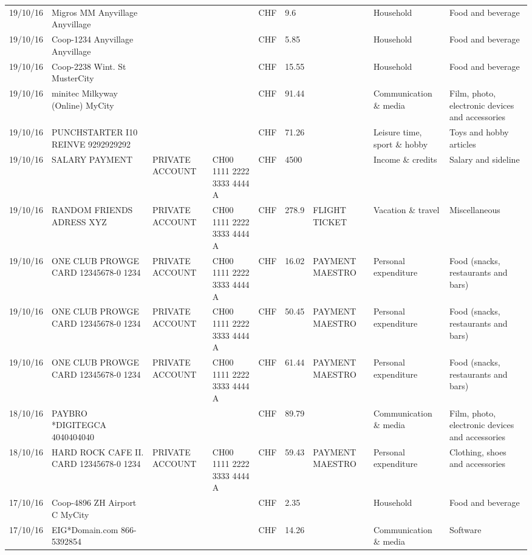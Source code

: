 \begin{landscape}
\begin{table}[t]
\begin{center}
\begin{tabular}{lllllllll}
		19/10/16 & Migros MM Anyvillage    Anyvillage &       &       & CHF   & 9.6   &       & Household & Food and beverage \\
		19/10/16 & Coop-1234 Anyvillage    Anyvillage &       &       & CHF   & 5.85  &       & Household & Food and beverage \\
		19/10/16 & Coop-2238 Wint. St       MusterCity &       &       & CHF   & 15.55 &       & Household & Food and beverage \\
		19/10/16 & minitec Milkyway (Online) MyCity &       &       & CHF   & 91.44 &       & Communication \& media & Film, photo, electronic devices and accessories \\
		19/10/16 & PUNCHSTARTER I10 REINVE   9292929292 &       &       & CHF   & 71.26 &       & Leisure time, sport \& hobby & Toys and hobby articles \\
		19/10/16 & SALARY PAYMENT & PRIVATE ACCOUNT & CH00 1111 2222 3333 4444 A & CHF   & 4500  &       & Income \& credits & Salary and sideline \\
		19/10/16 & RANDOM FRIENDS ADRESS XYZ & PRIVATE ACCOUNT & CH00 1111 2222 3333 4444 A & CHF   & 278.9 & FLIGHT TICKET & Vacation \& travel & Miscellaneous \\
		19/10/16 & ONE CLUB PROWGE CARD 12345678-0 1234 & PRIVATE ACCOUNT & CH00 1111 2222 3333 4444 A & CHF   & 16.02 & PAYMENT MAESTRO & Personal expenditure & Food (snacks, restaurants and bars) \\
		19/10/16 & ONE CLUB PROWGE CARD 12345678-0 1234 & PRIVATE ACCOUNT & CH00 1111 2222 3333 4444 A & CHF   & 50.45 & PAYMENT MAESTRO & Personal expenditure & Food (snacks, restaurants and bars) \\
		19/10/16 & ONE CLUB PROWGE CARD 12345678-0 1234 & PRIVATE ACCOUNT & CH00 1111 2222 3333 4444 A & CHF   & 61.44 & PAYMENT MAESTRO & Personal expenditure & Food (snacks, restaurants and bars) \\
		18/10/16 & PAYBRO *DIGITEGCA      4040404040 &       &       & CHF   & 89.79 &       & Communication \& media & Film, photo, electronic devices and accessories \\
		18/10/16 & HARD ROCK CAFE II. CARD 12345678-0 1234 & PRIVATE ACCOUNT & CH00 1111 2222 3333 4444 A & CHF   & 59.43 & PAYMENT MAESTRO & Personal expenditure & Clothing, shoes and accessories \\
		17/10/16 & Coop-4896 ZH Airport C   MyCity &       &       & CHF   & 2.35  &       & Household & Food and beverage \\
		17/10/16 & EIG*Domain.com           866-5392854 &       &       & CHF   & 14.26 &       & Communication \& media & Software \\

\end{tabular}
\end{center}
\end{table}
\end{landscape}
